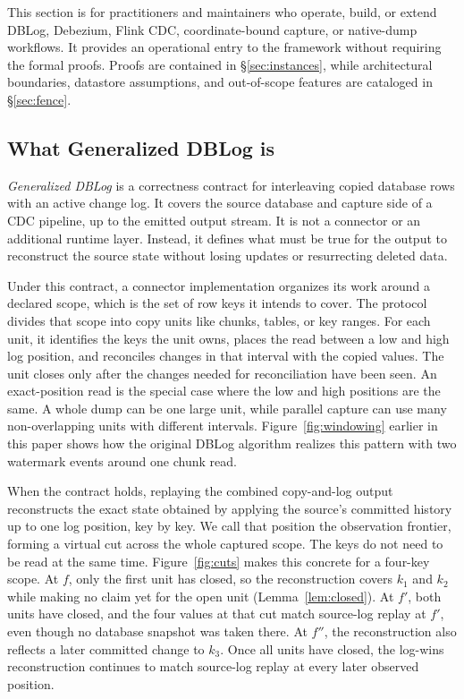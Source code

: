 \documentclass[sigconf,nonacm,10pt]{acmart}
\theoremstyle{plain}
\theoremstyle{definition}
\begin{document}
This section is for practitioners and maintainers who operate, build, or
extend DBLog, Debezium, Flink CDC, coordinate-bound capture, or native-dump
workflows. It provides an operational entry to the framework without
requiring the formal proofs. Proofs are contained in \S\ref{sec:instances}, 
while architectural boundaries, datastore assumptions, and out-of-scope 
features are cataloged in \S\ref{sec:fence}.

\subsection{What Generalized DBLog is}
\label{sec:practitioner-meaning}

\emph{Generalized DBLog} is a correctness contract for interleaving copied
database rows with an active change log. It covers the source database and
capture side of a CDC pipeline, up to the emitted output stream. It is not a
connector or an additional runtime layer. Instead, it defines what must be 
true for the output to reconstruct the source state without losing updates 
or resurrecting deleted data.

Under this contract, a connector implementation organizes its work around a 
declared scope, which is the set of row keys it intends to cover. The protocol 
divides that scope into copy units like
chunks, tables, or key ranges. For each unit, it identifies the keys the
unit owns, places the read between a low and high log position, and
reconciles changes in that interval with the copied values. The unit
closes only after the changes needed for reconciliation have been seen.
An exact-position read is the special case where the low and high
positions are the same. A whole dump can be one large unit, while parallel
capture can use many non-overlapping units with different intervals.
Figure~\ref{fig:windowing} earlier in this paper shows how the original
DBLog algorithm realizes this pattern with two watermark events around
one chunk read.

When the contract holds, replaying the combined copy-and-log output
reconstructs the exact state obtained by applying the source's committed
history up to one log position, key by key. We call that position the
observation frontier, forming a virtual cut across the whole captured scope.
The keys do not need to be read at the same time. Figure~\ref{fig:cuts} makes this concrete for a four-key scope. At $f$,
only the first unit has closed, so the reconstruction covers $k_1$ and $k_2$
while making no claim yet for the open unit (Lemma~\ref{lem:closed}). At $f'$,
both units have closed, and the four values at that cut match source-log
replay at $f'$, even though no database snapshot was taken there. At $f''$,
the reconstruction also reflects a later committed change to $k_3$. Once
all units have closed, the log-wins reconstruction continues to match
source-log replay at every later observed position.
\end{document}
